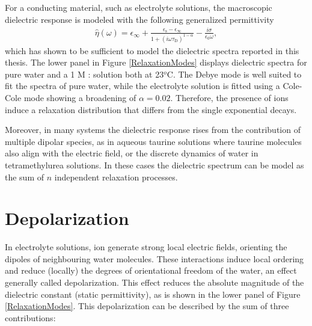 \newpage




For a conducting material, such as electrolyte solutions, the macroscopic dielectric response is modeled with the following generalized permittivity
\begin{eqnarray}
\hat{\eta} (\omega) = \epsilon_\infty + \frac{\epsilon_\text{s} - \epsilon_\infty }{1 + (i \omega \tau_\text{D})^{1-\alpha}} - \frac{i \sigma}{\epsilon_0 \omega},
\label{ColeConRelaxation}
\end{eqnarray}
\noindent which has shown to be sufficient to model the dielectric spectra reported in this thesis. The lower panel in Figure \ref{RelaxationModes} displays dielectric spectra for pure water and a 1 M : solution both at 23$^o$C. The Debye mode is well suited to fit the spectra of pure water, while the electrolyte solution is fitted using a Cole-Cole mode showing a broadening of $\alpha = 0.02$. Therefore, the presence of ions induce a relaxation distribution that differs from the single exponential decays.





Moreover, in many systems the dielectric response rises from the contribution of multiple dipolar species, as in aqueous taurine solutions where taurine molecules also align with the electric field,\!\cite{Smit2019} or the discrete dynamics of water in tetramethylurea solutions.\!\cite{Tielrooij2010a} In these cases the dielectric spectrum can be model as the sum of $n$ independent relaxation processes.




\section{Depolarization}\label{SectionDepola}


In electrolyte solutions, ion generate strong local electric fields, orienting the dipoles of neighbouring water molecules. These interactions induce local ordering and reduce (locally) the degrees of orientational freedom of the water, an effect generally called depolarization. This effect reduces the absolute magnitude of the dielectric constant (static permittivity), as is shown in the lower panel of Figure \ref{RelaxationModes}. This depolarization can be described by the sum of three contributions: 

